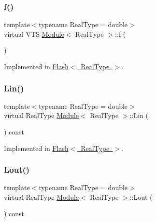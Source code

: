 \subsubsection{\texorpdfstring{f()}{f()}}
{\footnotesize\ttfamily template$<$typename Real\+Type  = double$>$ \\
virtual V\+TS \mbox{\hyperlink{class_module}{Module}}$<$ Real\+Type $>$\+::f (\begin{DoxyParamCaption}{ }\end{DoxyParamCaption})\hspace{0.3cm}{\ttfamily [pure virtual]}}



Implemented in \mbox{\hyperlink{class_flash_abd6eed865f215c9b4633547f154e91ec}{Flash$<$ Real\+Type $>$}}.

\mbox{\label{class_module_afd5ad051a1d37aac40709badad675732}} 
\subsubsection{\texorpdfstring{Lin()}{Lin()}}
{\footnotesize\ttfamily template$<$typename Real\+Type  = double$>$ \\
virtual Real\+Type \mbox{\hyperlink{class_module}{Module}}$<$ Real\+Type $>$\+::Lin (\begin{DoxyParamCaption}{ }\end{DoxyParamCaption}) const\hspace{0.3cm}{\ttfamily [pure virtual]}}



Implemented in \mbox{\hyperlink{class_flash_a074095aaca2230d0bc8d9e5cc513086c}{Flash$<$ Real\+Type $>$}}.

\mbox{\label{class_module_a0258058bfb378f0016b3306dcb8082f3}} 
\subsubsection{\texorpdfstring{Lout()}{Lout()}}
{\footnotesize\ttfamily template$<$typename Real\+Type  = double$>$ \\
virtual Real\+Type \mbox{\hyperlink{class_module}{Module}}$<$ Real\+Type $>$\+::Lout (\begin{DoxyParamCaption}{ }\end{DoxyParamCaption}) const\hspace{0.3cm}{\ttfamily [pure virtual]}}



